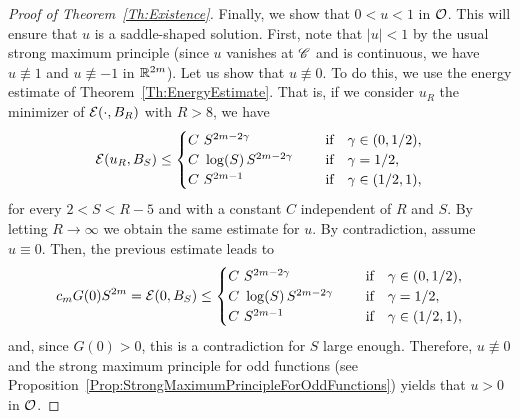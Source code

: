 \begin{proof}[Proof of Theorem~\ref{Th:Existence}]
Finally, we show that $0<u<1$ in $\mathcal{O}$. This will ensure that $u$ is a saddle-shaped solution. First, note that $|u| < 1$ by the usual strong maximum principle (since $u$ vanishes at $\mathscr{C}$ and is continuous, we have $u \not \equiv 1$  and $u\not\equiv -1$ in $\mathbb{R}^{2m}$). Let us show that $u\not\equiv 0$. To do this, we use the energy estimate of Theorem~\ref{Th:EnergyEstimate}. That is, if we consider $u_R$ the minimizer of $\mathcal{E}(\cdot, B_R)$ with $R > 8$, we have
$$
\mathcal{E} (u_R,B_S) \leq \begin{cases}
C \ S^{2m-2\gamma}\ \ \ \ &\textrm{if } \ \ \gamma\in(0,1/2),\\
C\ \log(S)\,S^{2m-2\gamma}\ \ \ \ &\textrm{if } \ \ \gamma=1/2,\\
C \ S^{2m-1}\ \ \ \ &\textrm{if } \ \ \gamma\in(1/2,1),\\
\end{cases} $$
for every $2 < S < R-5$ and with a constant $C$ independent of $R$ and $S$. By letting $R \to \infty$ we obtain the same estimate for $u$. By contradiction, assume $u\equiv 0$. Then, the previous estimate leads to
$$
c_m G(0)S^{2m} = \mathcal{E}(0, B_S) \leq \begin{cases}
C \ S^{2m-2\gamma}\ \ \ \ &\textrm{if } \ \ \gamma\in(0,1/2),\\
C\ \log(S)\,S^{2m-2\gamma}\ \ \ \ &\textrm{if } \ \ \gamma=1/2,\\
C \ S^{2m-1}\ \ \ \ &\textrm{if } \ \ \gamma\in(1/2,1),\\
\end{cases} $$
and, since $G(0)>0$, this is a contradiction for $S$ large enough. Therefore, $u \not \equiv 0$ and the strong maximum principle for odd functions (see Proposition~\ref{Prop:StrongMaximumPrincipleForOddFunctions}) yields that $u>0$ in $\mathcal{O}$. 
\end{proof}

